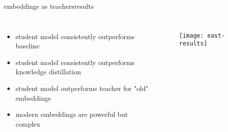 \begin{frame}{embeddings as teachers}{results}
    \begin{columns}
			\begin{itemize}
					\item   student model consistently outperforms baseline \cite{ding_audio_2023}
					\smallskip
					\item   student model consistently outperforms knowledge distillation
					\smallskip
					\item   student model outperforms teacher for "old" embeddings
					\smallskip
					\item   modern embeddings are powerful but complex
			\end{itemize}
			\begin{figure}
			\texttt{[image: east-results]}
			\end{figure}
		\end{columns}
\end{frame}

 